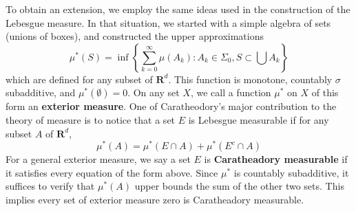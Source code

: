 To obtain an extension, we employ the same ideas used in the construction of the Lebesgue measure. In that situation, we started with a simple algebra of sets (unions of boxes), and constructed the upper approximations
%
\[ \mu^*(S) = \inf \left\{ \sum_{k = 0}^\infty \mu(A_k) : A_k \in \Sigma_0, S \subset \bigcup A_k \right\} \]
%
which are defined for any subset of $\mathbf{R}^d$. This function is monotone, countably $\sigma$ subadditive, and $\mu^*(\emptyset) = 0$. On any set $X$, we call a function $\mu^*$ on $X$ of this form an {\bf exterior measure}. One of Caratheodory's major contribution to the theory of measure is to notice that a set $E$ is Lebesgue measurable if for any subset $A$ of $\mathbf{R}^d$,
%
\[ \mu^*(A) = \mu^*(E \cap A) + \mu^*(E^c \cap A) \]
%
For a general exterior measure, we say a set $E$ is {\bf Caratheadory measurable} if it satisfies every equation of the form above. Since $\mu^*$ is countably subadditive, it suffices to verify that $\mu^*(A)$ upper bounds the sum of the other two sets. This implies every set of exterior measure zero is Caratheadory measurable.

